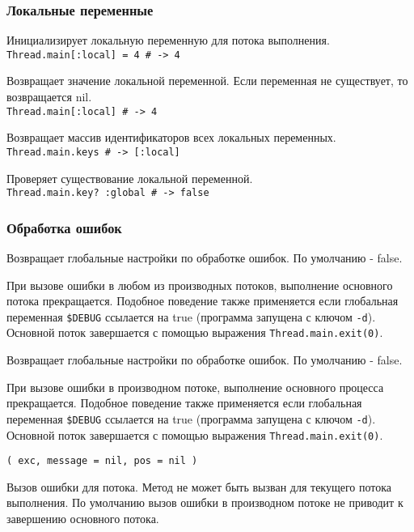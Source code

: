 \subsubsection*{Локальные переменные}

\begin{methodlist}
  Инициализирует локальную переменную для потока выполнения.
  \\\verb!Thread.main[:local] = 4 # -> 4!
 
  Возвращает значение локальной переменной. Если переменная не существует, то возвращается nil.
  \\\verb!Thread.main[:local] # -> 4!
 
  Возвращает массив идентификаторов всех локальных переменных.
  \\\verb!Thread.main.keys # -> [:local]!
 
  Проверяет существование локальной переменной.
  \\\verb!Thread.main.key? :global # -> false!
\end{methodlist}

\subsubsection*{Обработка ошибок}

\begin{methodlist}
  Возвращает глобальные настройки по обработке ошибок. По умолчанию - false. 
 
  При вызове ошибки в любом из производных потоков, выполнение основного потока прекращается. Подобное поведение также применяется если глобальная переменная \verb!$DEBUG! ссылается на true (программа запущена с ключом \verb!-d!). Основной поток завершается с помощью выражения \verb!Thread.main.exit(0)!. 

  Возвращает глобальные настройки по обработке ошибок. По умолчанию - false. 
 
  При вызове ошибки в производном потоке, выполнение основного процесса прекращается. Подобное поведение также применяется если глобальная переменная \verb!$DEBUG! ссылается на true (программа запущена с ключом \verb!-d!). Основной поток завершается с помощью выражения \verb!Thread.main.exit(0)!.

  \verb!( exc, message = nil, pos = nil )!

  Вызов ошибки для потока. Метод не может быть вызван для текущего потока выполнения. По умолчанию вызов ошибки в производном потоке не приводит к завершению основного потока.
\end{methodlist}

